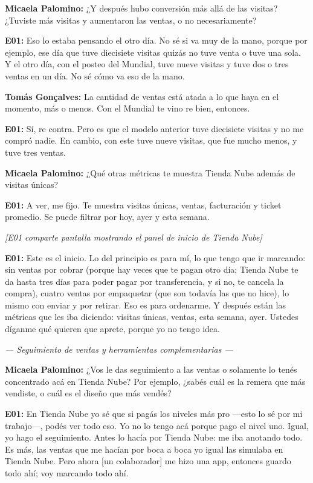 \noindent\textbf{Micaela Palomino:} ¿Y después hubo conversión más allá de las visitas? ¿Tuviste más visitas y aumentaron las ventas, o no necesariamente?

\noindent\textbf{E01:} Eso lo estaba pensando el otro día. No sé si va muy de la mano, porque por ejemplo, ese día que tuve diecisiete visitas quizás no tuve venta o tuve una sola. Y el otro día, con el posteo del Mundial, tuve nueve visitas y tuve dos o tres ventas en un día. No sé cómo va eso de la mano.

\noindent\textbf{Tomás Gonçalves:} La cantidad de ventas está atada a lo que haya en el momento, más o menos. Con el Mundial te vino re bien, entonces.

\noindent\textbf{E01:} Sí, re contra. Pero es que el modelo anterior tuve diecisiete visitas y no me compró nadie. En cambio, con este tuve nueve visitas, que fue mucho menos, y tuve tres ventas.

\noindent\textbf{Micaela Palomino:} ¿Qué otras métricas te muestra Tienda Nube además de visitas únicas?

\noindent\textbf{E01:} A ver, me fijo. Te muestra visitas únicas, ventas, facturación y ticket promedio. Se puede filtrar por hoy, ayer y esta semana.

\noindent\textit{[E01 comparte pantalla mostrando el panel de inicio de Tienda Nube]}

\noindent\textbf{E01:} Este es el inicio. Lo del principio es para mí, lo que tengo que ir marcando: sin ventas por cobrar (porque hay veces que te pagan otro día; Tienda Nube te da hasta tres días para poder pagar por transferencia, y si no, te cancela la compra), cuatro ventas por empaquetar (que son todavía las que no hice), lo mismo con enviar y por retirar. Eso es para ordenarme. Y después están las métricas que les iba diciendo: visitas únicas, ventas, esta semana, ayer. Ustedes díganme qué quieren que aprete, porque yo no tengo idea.

\noindent\textit{--- Seguimiento de ventas y herramientas complementarias ---}

\noindent\textbf{Micaela Palomino:} ¿Vos le das seguimiento a las ventas o solamente lo tenés concentrado acá en Tienda Nube? Por ejemplo, ¿sabés cuál es la remera que más vendiste, o cuál es el diseño que más vendés?

\noindent\textbf{E01:} En Tienda Nube yo sé que si pagás los niveles más pro ---esto lo sé por mi trabajo---, podés ver todo eso. Yo no lo tengo acá porque pago el nivel uno. Igual, yo hago el seguimiento. Antes lo hacía por Tienda Nube: me iba anotando todo. Es más, las ventas que me hacían por boca a boca yo igual las simulaba en Tienda Nube. Pero ahora [un colaborador] me hizo una app, entonces guardo todo ahí; voy marcando todo ahí.

